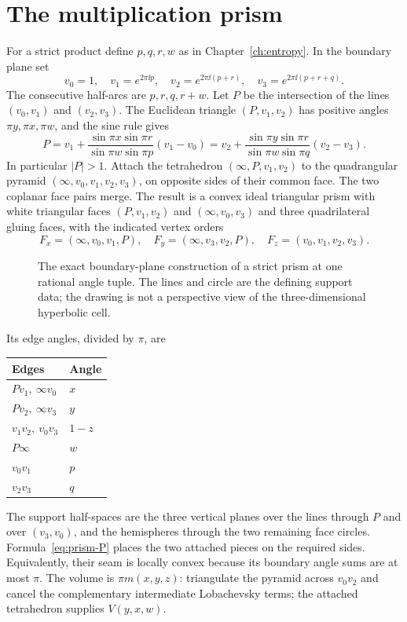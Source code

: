 \section{The multiplication prism}
For a strict product define $p,q,r,w$ as in Chapter~\ref{ch:entropy}. In the boundary plane set
\begin{equation}\label{eq:prism-vertices}
 v_0=1,\quad v_1=e^{2\pi\ii p},\quad
 v_2=e^{2\pi\ii(p+r)},\quad
 v_3=e^{2\pi\ii(p+r+q)}.
\end{equation}
The consecutive half-arcs are $p,r,q,r+w$. Let $P$ be the intersection of the lines $(v_0,v_1)$ and $(v_2,v_3)$. The Euclidean triangle $(P,v_1,v_2)$ has positive angles $\pi y,\pi x,\pi w$, and the sine rule gives
\begin{equation}\label{eq:prism-P}
 P=v_1+\frac{\sin\pi x\sin\pi r}{\sin\pi w\sin\pi p}(v_1-v_0)
  =v_2+\frac{\sin\pi y\sin\pi r}{\sin\pi w\sin\pi q}(v_2-v_3).
\end{equation}
In particular $|P|>1$. Attach the tetrahedron $(\infty,P,v_1,v_2)$ to the quadrangular pyramid $(\infty,v_0,v_1,v_2,v_3)$, on opposite sides of their common face. The two coplanar face pairs merge. The result is a convex ideal triangular prism with white triangular faces $(P,v_1,v_2)$ and $(\infty,v_0,v_3)$ and three quadrilateral gluing faces, with the indicated vertex orders
\begin{equation}\label{eq:prism-ports}
 F_x=(\infty,v_0,v_1,P),\quad
 F_y=(\infty,v_3,v_2,P),\quad
 F_z=(v_0,v_1,v_2,v_3).
\end{equation}
\begin{figure}[ht]
\centering

\caption{The exact boundary-plane construction of a strict prism at one rational angle tuple. The lines and circle are the defining support data; the drawing is not a perspective view of the three-dimensional hyperbolic cell.}\label{fig:prism}
\end{figure}

Its edge angles, divided by $\pi$, are
\begin{center}
\begin{tabular}{ll}\toprule
Edges & Angle\\\midrule
$Pv_1,\ \infty v_0$ & $x$\\
$Pv_2,\ \infty v_3$ & $y$\\
$v_1v_2,\ v_0v_3$ & $1-z$\\
$P\infty$ & $w$\\
$v_0v_1$ & $p$\\
$v_2v_3$ & $q$\\\bottomrule
\end{tabular}
\end{center}
The support half-spaces are the three vertical planes over the lines through $P$ and over $(v_3,v_0)$, and the hemispheres through the two remaining face circles. Formula~\eqref{eq:prism-P} places the two attached pieces on the required sides. Equivalently, their seam is locally convex because its boundary angle sums are at most $\pi$. The volume is $\pi m(x,y,z)$: triangulate the pyramid across $v_0v_2$ and cancel the complementary intermediate Lobachevsky terms; the attached tetrahedron supplies $V(y,x,w)$.


